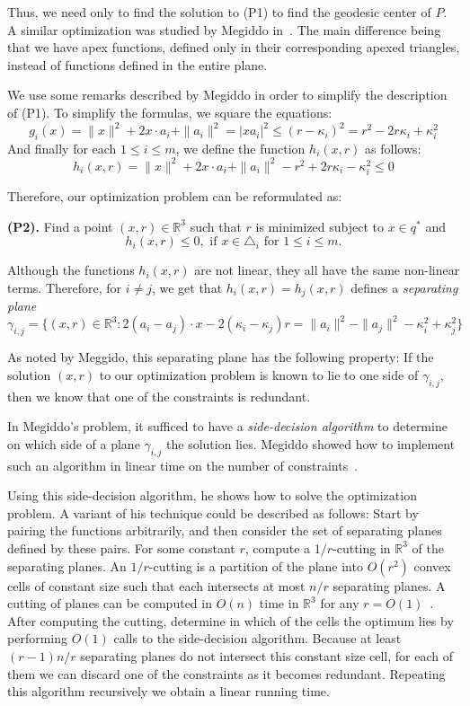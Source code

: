 \documentclass[a4paper,UKenglish]{lipics}
\begin{document}
Thus, we need only to find the solution to (P1) to find the geodesic center of $P$.
A similar optimization was studied by Megiddo in~\cite{megiddo1989ball}. 
The main difference being that we have apex functions, defined only in their corresponding apexed triangles, instead of functions defined in the entire plane. 

We use some remarks described by Megiddo in order to simplify the description of (P1).
To simplify the formulas, we square the equations:
$$g_i(x) = \|x\|^2 + 2x\cdot a_i + \|a_i\|^2  = |x a_i|^2 \leq (r - \kappa_i)^2 = r^2 - 2r\kappa_i + \kappa_i^2$$ 
And finally for each $1\leq i\leq m$, we define the function $h_i(x, r)$ as follows:
$$h_i(x, r) = \|x\|^2 + 2x\cdot a_i + \|a_i\|^2  - r^2 + 2r\kappa_i - \kappa_i^2 \leq 0$$

Therefore, our optimization problem can be reformulated as:

\textbf{(P2).} Find a point $(x,r)\in \mathbb{R}^3$ such that $r$ is minimized subject to $x\in q^*$ and 
$$h_i(x, r) \leq 0, \text{ if $x\in \triangle_{i}$ for $1\leq i \leq m$}.$$%

Although the functions $h_i(x,r)$ are not linear, they all have the same non-linear terms. Therefore, for $i\neq j$, we get that
$h_i(x,r) = h_j(x, r)$ defines a \emph{separating plane}
$$\gamma_{i,j} = \{(x, r) \in \mathbb{R}^3: 2 (a_i - a_j) \cdot x - 2( \kappa_i - \kappa_j) r = \|a_i\|^2 - \|a_j\|^2 - \kappa_i^2 + \kappa_j^2\}$$

As noted by Meggido, this separating plane has the following property:
If the solution $(x, r)$ to our optimization problem is known to lie to one side of $\gamma_{i,j}$, then we know that one of the constraints is redundant. 

In Megiddo's problem, it sufficed to have a \emph{side-decision algorithm} to determine on which side of a plane $\gamma_{i,j}$ the solution lies. Megiddo showed how to implement such an algorithm in linear time on the number of constraints~\cite{megiddo1989ball}.

Using this side-decision algorithm, he shows how to solve the optimization problem. A variant of his technique could be described as follows: Start by pairing the functions arbitrarily, and then consider the set of separating planes defined by these pairs.
For some constant $r$, compute a $1/r$-cutting in $\mathbb{R}^3$ of the separating planes.
An $1/r$-cutting is a partition of the plane into $O(r^2)$ convex cells of constant size such that each intersects at most $n/r$ separating planes.
A cutting of planes can be computed in $O(n)$ time in $\mathbb{R}^3$ for any $r = O(1)$~\cite{matousekCuttings}.
After computing the cutting, determine in which of the cells the optimum lies by performing $O(1)$ calls to the side-decision algorithm. 
Because at least $(r-1)n/r$ separating planes do not intersect this constant size cell, for each of them we can discard one of the constraints as it becomes redundant. Repeating this algorithm recursively we obtain a linear running time.
\end{document}
